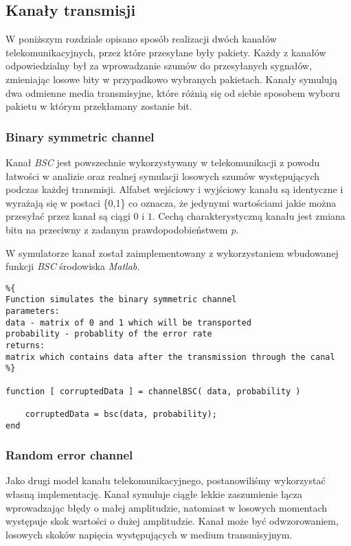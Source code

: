 \documentclass{article}
\begin{document}
\subsection{Kanały transmisji}

W poniższym rozdziale opisano sposób realizacji dwóch kanałów telekomunikacyjnych, przez które przesyłane były pakiety. Każdy z kanałów odpowiedzialny był za wprowadzanie szumów do przesyłanych sygnałów, zmieniając losowe bity w przypadkowo wybranych pakietach. Kanały symulują dwa odmienne media transmisyjne, które różnią się od siebie sposobem wyboru pakietu w którym przekłamany zostanie bit.

\subsubsection{Binary symmetric channel}

Kanał \textit{BSC} jest powszechnie wykorzystywany w telekomunikacji z powodu łatwości w analizie oraz realnej symulacji losowych szumów występujących podczas każdej transmisji. Alfabet wejściowy i wyjściowy kanału są identyczne i wyrażają się w postaci \{0,1\} co oznacza, że jedynymi wartościami jakie można przesyłać przez kanał są ciągi $0$ i $1$. Cechą charakterystyczną kanału jest zmiana bitu na przeciwny z zadanym prawdopodobieństwem \textit{p}.

W symulatorze kanał został zaimplementowany z wykorzystaniem wbudowanej funkcji \textit{BSC} środowiska \textit{Matlab}.

\begin{verbatim}
%{
Function simulates the binary symmetric channel
parameters:
data - matrix of 0 and 1 which will be transported
probability - probablity of the error rate
returns:
matrix which contains data after the transmission through the canal
%}

function [ corruptedData ] = channelBSC( data, probability )

    corruptedData = bsc(data, probability);
end
\end{verbatim}

\subsubsection{Random error channel}

Jako drugi model kanału telekomunikacyjnego, postanowiliśmy wykorzystać własną implementację. Kanał symuluje ciągłe lekkie zaszumienie łącza wprowadzając błędy o małej amplitudzie, natomiast w losowych momentach występuje skok wartości o dużej amplitudzie. Kanał może być odwzorowaniem, losowych skoków napięcia występujących w medium transmisyjnym.
\end{document}
